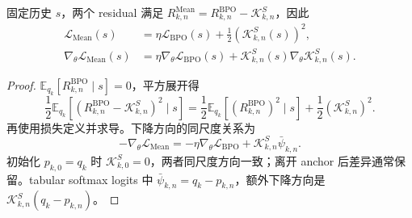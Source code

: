 \documentclass[lang=cn,scheme=chinese,openany]{../book/elegantbook}
\begin{document}
\begin{proposition}
\label{prop:ch2-mean-bpo-gap}
固定历史 $s$，两个 residual 满足 $R_{k,n}^{\mathrm{Mean}}=R_{k,n}^{\mathrm{BPO}}-\mathcal K_{k,n}^{S}$，因此
\begin{align}
\mathcal L_{\mathrm{Mean}}(s)&=\eta\mathcal L_{\mathrm{BPO}}(s)+\frac12(\mathcal K_{k,n}^{S}(s))^2,\\
\nabla_\theta\mathcal L_{\mathrm{Mean}}(s)&=\eta\nabla_\theta\mathcal L_{\mathrm{BPO}}(s)+\mathcal K_{k,n}^{S}(s)\nabla_\theta\mathcal K_{k,n}^{S}(s).
\label{eq:ch2-mean-bpo-gap}
\end{align}
\end{proposition}
\begin{proof}
$\mathbb E_{ q_k}[R_{k,n}^{\mathrm{BPO}}\mid s]=0$，平方展开得
\begin{equation*}
\frac12\mathbb E_{ q_k}[(R_{k,n}^{\mathrm{BPO}}-\mathcal K_{k,n}^{S})^2\mid s]
=\frac12\mathbb E_{ q_k}[(R_{k,n}^{\mathrm{BPO}})^2\mid s]+\frac12(\mathcal K_{k,n}^{S})^2.
\end{equation*}
再使用损失定义并求导。下降方向的同尺度关系为
\begin{equation*}
-\nabla_\theta\mathcal L_{\mathrm{Mean}}
=-\eta\nabla_\theta\mathcal L_{\mathrm{BPO}}+\mathcal K_{k,n}^{S}\bar\psi_{k,n}.
\end{equation*}
初始化 $ p_{k,0}= q_k$ 时 $\mathcal K_{k,0}^{S}=0$，两者同尺度方向一致；离开 anchor 后差异通常保留。tabular softmax logits 中 $\bar\psi_{k,n}= q_k- p_{k,n}$，额外下降方向是 $\mathcal K_{k,n}^{S}( q_k- p_{k,n})$。
\end{proof}
\end{document}
